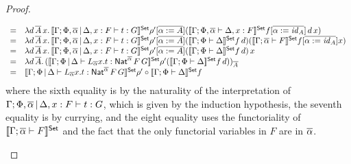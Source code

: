 \documentclass[acmsmall,review,anonymous]{acmart}
\theoremstyle{definition}
\renewcommand{\id}{\mathit{id}}
\begin{document}
\begin{proof}
\begin{itemize}
\[\begin{array}{ll}
  = & \lambda d\, \ol{A}\, x.\,
  \setsem{\Gamma;\Phi, \ol{\alpha} \,|\, \Delta, x : F \vdash t : G}\rho'[\ol{\alpha := A}]
  (\setsem{\Gamma;\Phi,\ol{\alpha} \vdash \Delta, x : F}f[\ol{\alpha := \id_A}] \, d\, x) \\
  = & \lambda d\, \ol{A}\, x.\,
  \setsem{\Gamma;\Phi, \ol{\alpha} \,|\, \Delta, x : F \vdash t : G}\rho'[\ol{\alpha := A}]
  (\setsem{\Gamma;\Phi \vdash \Delta}f\, d)
  (\setsem{\Gamma;\ol{\alpha} \vdash F}f[\ol{\alpha := \id_A}] x) \\
  = & \lambda d\, \ol{A}\, x.\,
  \setsem{\Gamma;\Phi, \ol{\alpha} \,|\, \Delta, x : F \vdash t : G}\rho'[\ol{\alpha := A}]
  (\setsem{\Gamma;\Phi \vdash \Delta}f\, d)\, x \\
  = & \lambda d\, \ol{A}.\,
  (\setsem{\Gamma;\Phi \,|\, \Delta \vdash L_{\overline{\alpha}} x.t : \Nat^{\overline{\alpha}} \,F \,G}\rho'
  (\setsem{\Gamma;\Phi \vdash \Delta}f\, d))_{\ol{A}} \\
  = &
  \setsem{\Gamma;\Phi \,|\, \Delta \vdash L_{\overline{\alpha}} x.t : \Nat^{\overline{\alpha}} \,F \,G}\rho'
  \circ
  \setsem{\Gamma;\Phi \vdash \Delta}f
  \end{array}\]
  where the sixth equality is by the naturality of the interpretation
  of $\Gamma;\Phi, \overline{\alpha} \,|\, \Delta, x : F \vdash t : G$,
  which is given by the induction hypothesis, the seventh equality is
  by currying, and the eight equality uses the functoriality of
  $\llbracket{\Gamma;\overline{\alpha} \vdash F}\rrbracket^{\mathsf{Set}}$ and the fact that the only
  functorial variables in $F$ are in $\overline{\alpha}$.


\end{itemize}
\end{proof}
\end{document}
